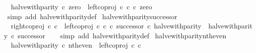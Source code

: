 \begin{isabellebody}
\ \ {\isachardoublequoteopen}halve{\isacharunderscore}{\kern0pt}with{\isacharunderscore}{\kern0pt}parity\ {\isasymcirc}\isactrlsub c\ zero\ {\isacharequal}{\kern0pt}\ left{\isacharunderscore}{\kern0pt}coproj\ {\isasymnat}\isactrlsub c\ {\isasymnat}\isactrlsub c\ {\isasymcirc}\isactrlsub c\ zero{\isachardoublequoteclose}\isanewline
%
\isadelimproof
\ \ %
\endisadelimproof
%
\isatagproof
{}\isamarkupfalse%
\ {\isacharparenleft}{\kern0pt}simp\ add{\isacharcolon}{\kern0pt}\ halve{\isacharunderscore}{\kern0pt}with{\isacharunderscore}{\kern0pt}parity{\isacharunderscore}{\kern0pt}def{}{\isacharparenright}{\kern0pt}%
\endisatagproof
{\isafoldproof}%
%
\isadelimproof
\isanewline
%
\endisadelimproof
\isanewline
{}\isamarkupfalse%
\ halve{\isacharunderscore}{\kern0pt}with{\isacharunderscore}{\kern0pt}parity{\isacharunderscore}{\kern0pt}successor{\isacharcolon}{\kern0pt}\isanewline
\ \ {\isachardoublequoteopen}{\isacharparenleft}{\kern0pt}right{\isacharunderscore}{\kern0pt}coproj\ {\isasymnat}\isactrlsub c\ {\isasymnat}\isactrlsub c\ {\isasymamalg}\ {\isacharparenleft}{\kern0pt}left{\isacharunderscore}{\kern0pt}coproj\ {\isasymnat}\isactrlsub c\ {\isasymnat}\isactrlsub c\ {\isasymcirc}\isactrlsub c\ successor{\isacharparenright}{\kern0pt}{\isacharparenright}{\kern0pt}\ {\isasymcirc}\isactrlsub c\ halve{\isacharunderscore}{\kern0pt}with{\isacharunderscore}{\kern0pt}parity\ {\isacharequal}{\kern0pt}\ halve{\isacharunderscore}{\kern0pt}with{\isacharunderscore}{\kern0pt}parity\ {\isasymcirc}\isactrlsub c\ successor{\isachardoublequoteclose}\isanewline
%
\isadelimproof
\ \ %
\endisadelimproof
%
\isatagproof
{}\isamarkupfalse%
\ {\isacharparenleft}{\kern0pt}simp\ add{\isacharcolon}{\kern0pt}\ halve{\isacharunderscore}{\kern0pt}with{\isacharunderscore}{\kern0pt}parity{\isacharunderscore}{\kern0pt}def{}{\isacharparenright}{\kern0pt}%
\endisatagproof
{\isafoldproof}%
%
\isadelimproof
\isanewline
%
\endisadelimproof
\isanewline
{}\isamarkupfalse%
\ halve{\isacharunderscore}{\kern0pt}with{\isacharunderscore}{\kern0pt}parity{\isacharunderscore}{\kern0pt}nth{\isacharunderscore}{\kern0pt}even{\isacharcolon}{\kern0pt}\isanewline
\ \ {\isachardoublequoteopen}halve{\isacharunderscore}{\kern0pt}with{\isacharunderscore}{\kern0pt}parity\ {\isasymcirc}\isactrlsub c\ nth{\isacharunderscore}{\kern0pt}even\ {\isacharequal}{\kern0pt}\ left{\isacharunderscore}{\kern0pt}coproj\ {\isasymnat}\isactrlsub c\ {\isasymnat}\isactrlsub c{\isachardoublequoteclose}\isanewline
%
\isadelimproof
%
\endisadelimproof
%
\isatagproof

\end{isabellebody}
